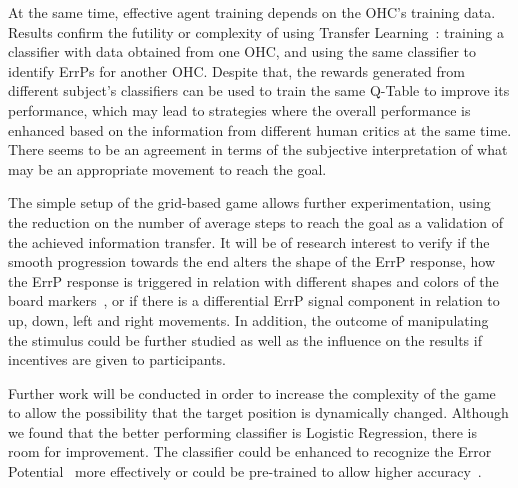 \documentclass[journal]{IEEEtran}
\begin{document}
{{%

At the same time, effective agent training depends on the OHC's training data. Results confirm the futility or complexity of using Transfer Learning~\cite{Wu2016}: training a classifier with data obtained from one OHC, and using the same classifier to identify ErrPs for another OHC.  Despite that, the rewards generated from different subject's classifiers can be used to train the same Q-Table to improve its performance, which may lead to strategies where the overall performance is enhanced based on the information from different human critics at the same time.  There seems to be an agreement in terms of the subjective interpretation of what may be an appropriate movement to reach the goal.

The simple setup of the grid-based game allows further experimentation, using the reduction on the number of average steps to reach the goal as a validation of the achieved information transfer.  It will be of research interest to verify if the smooth progression towards the end alters the shape of the ErrP response, how the ErrP response is triggered in relation with different shapes and colors of the board markers~\cite{EIMER1997143}, or if there is a differential ErrP signal component in relation to up, down, left and right movements.  In addition, the outcome of manipulating the stimulus could be further studied as well as the influence on the results if incentives are given to participants.

Further work will be conducted in order to increase the complexity of the game to allow the possibility that the target position is dynamically changed.  Although we found that the better performing classifier is Logistic Regression, there is room for improvement.  The classifier could be enhanced to recognize the Error Potential~\cite{Iwane2017} more effectively or could be pre-trained to allow higher accuracy~\cite{Spuler2012}.



}}
\end{document}
